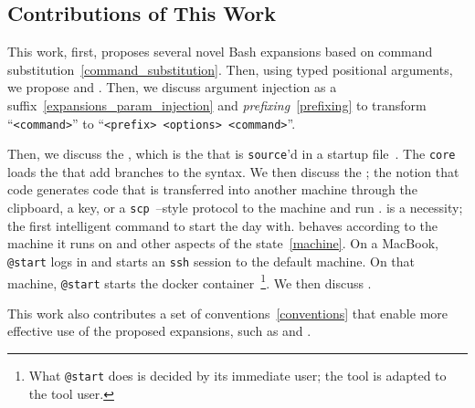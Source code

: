 \subsection{Contributions of This Work}\label{contributions}

This work, first, proposes several novel Bash expansions based on command substitution~\ref{command_substitution}. Then, using typed positional arguments, we propose  and . Then, we discuss argument injection as a suffix~\ref{expansions_param_injection} and \emph{prefixing}~\ref{prefixing} to transform ``\texttt{<command>}'' to ``\texttt{<prefix> <options> <command>}''.

Then, we discuss the , which is the \kCallable that is \texttt{source}'d in a startup file~\cite{bash_startup_files}. The \texttt{core} loads the  that add branches to the syntax. We then discuss the \kSeed; the notion that code generates code that is transferred into another machine through the clipboard, a key, or a \texttt{scp}~\cite{scp}--style protocol to  the machine and run . \kStart is a necessity; the first intelligent command to start the day with. \kStart behaves according to the machine it runs on and other aspects of the state~\ref{machine}. On a MacBook, \texttt{@start} logs in and starts an \texttt{ssh} session to the default machine. On that machine, \texttt{@start} starts the docker container~\footnote{What \texttt{@start} does is decided by its immediate user; the tool is adapted to the tool user.}. We then discuss \kGit.

This work also contributes a set of conventions~\ref{conventions} that enable more effective use of the proposed expansions, such as  and .